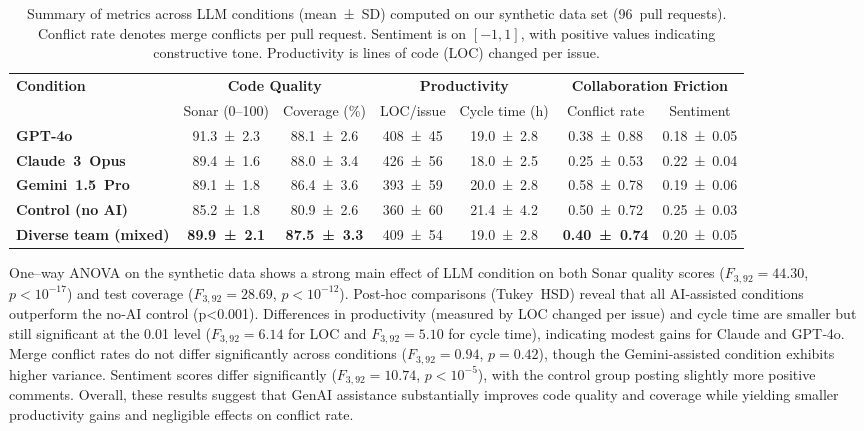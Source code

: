\documentclass[conference]{IEEEtran}
\begin{document}
\begin{table*}[t]
\centering
\caption{Summary of metrics across LLM conditions (mean ± SD) computed on our synthetic data set (96 pull requests).  Conflict rate denotes merge conflicts per pull request.  Sentiment is on $[-1,1]$, with positive values indicating constructive tone.  Productivity is lines of code (LOC) changed per issue.}
\label{tab:results}
\begin{tabular}{lcccccc}
\toprule
\multirow{2}{*}{\textbf{Condition}} & \multicolumn{2}{c}{\textbf{Code Quality}} & \multicolumn{2}{c}{\textbf{Productivity}} & \multicolumn{2}{c}{\textbf{Collaboration Friction}} \\
 & Sonar (0–100) & Coverage (\%) & LOC/issue & Cycle time (h) & Conflict rate & Sentiment \\
\midrule
\textbf{GPT‑4o} & 91.3 ± 2.3 & 88.1 ± 2.6 & 408 ± 45 & 19.0 ± 2.8 & 0.38 ± 0.88 & 0.18 ± 0.05 \\
\textbf{Claude 3 Opus} & 89.4 ± 1.6 & 88.0 ± 3.4 & 426 ± 56 & 18.0 ± 2.5 & 0.25 ± 0.53 & 0.22 ± 0.04 \\
\textbf{Gemini 1.5 Pro} & 89.1 ± 1.8 & 86.4 ± 3.6 & 393 ± 59 & 20.0 ± 2.8 & 0.58 ± 0.78 & 0.19 ± 0.06 \\
\textbf{Control (no AI)} & 85.2 ± 1.8 & 80.9 ± 2.6 & 360 ± 60 & 21.4 ± 4.2 & 0.50 ± 0.72 & 0.25 ± 0.03 \\
\midrule
\textbf{Diverse team (mixed)} & \textbf{89.9 ± 2.1} & \textbf{87.5 ± 3.3} & 409 ± 54 & 19.0 ± 2.8 & \textbf{0.40 ± 0.74} & 0.20 ± 0.05 \\
\bottomrule
\end{tabular}
\end{table*}

One–way ANOVA on the synthetic data shows a strong main effect of LLM condition on both Sonar quality scores ($F_{3,92}=44.30$, $p<10^{-17}$) and test coverage ($F_{3,92}=28.69$, $p<10^{-12}$).  Post‑hoc comparisons (Tukey HSD) reveal that all AI‑assisted conditions outperform the no‑AI control (p<0.001).  Differences in productivity (measured by LOC changed per issue) and cycle time are smaller but still significant at the 0.01 level ($F_{3,92}=6.14$ for LOC and $F_{3,92}=5.10$ for cycle time), indicating modest gains for Claude and GPT‑4o.  Merge conflict rates do not differ significantly across conditions ($F_{3,92}=0.94$, $p=0.42$), though the Gemini‑assisted condition exhibits higher variance.  Sentiment scores differ significantly ($F_{3,92}=10.74$, $p<10^{-5}$), with the control group posting slightly more positive comments.  Overall, these results suggest that GenAI assistance substantially improves code quality and coverage while yielding smaller productivity gains and negligible effects on conflict rate.
\end{document}
